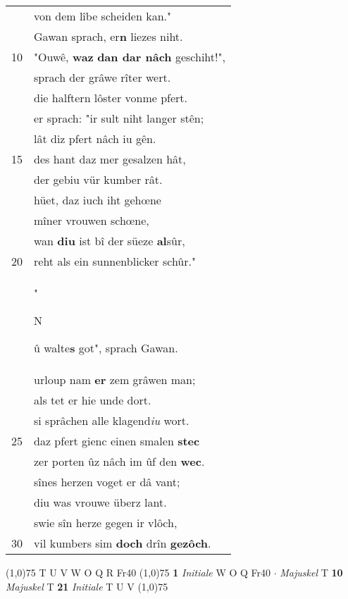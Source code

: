 \documentclass[8pt,a4paper,notitlepage]{article}
\begin{document}
\begin{table}[ht]
\begin{minipage}[t]{0.5\linewidth}
\begin{tabular}{rl}
 & von dem lîbe scheiden kan."\\ 
 & Gawan sprach, er\textbf{n} liezes niht.\\ 
10 & "Ouwê, \textbf{waz} \textbf{dan dar nâch} geschiht!",\\ 
 & sprach der grâwe rîter wert.\\ 
 & die halftern lôster vonme pfert.\\ 
 & er sprach: "ir sult niht langer stên;\\ 
 & lât diz pfert nâch iu gên.\\ 
15 & des hant daz mer gesalzen hât,\\ 
 & der gebiu vür kumber rât.\\ 
 & hüet, daz iuch iht gehœne\\ 
 & mîner vrouwen schœne,\\ 
 & wan \textbf{diu} ist bî der süeze \textbf{al}sûr,\\ 
20 & reht als ein sunnenblicker schûr."\\ 
 & "\begin{large}N\end{large}û walte\textbf{s} got", sprach Gawan.\\ 
 & urloup nam \textbf{er} zem grâwen man;\\ 
 & als tet er hie unde dort.\\ 
 & si sprâchen alle klagend\textit{iu} wort.\\ 
25 & daz pfert gienc einen smalen \textbf{stec}\\ 
 & zer porten ûz nâch im ûf den \textbf{wec}.\\ 
 & sînes herzen voget er dâ vant;\\ 
 & diu was vrouwe überz lant.\\ 
 & swie sîn herze gegen ir vlôch,\\ 
30 & vil kumbers sim \textbf{doch} drîn \textbf{gezôch}.\\ 
\end{tabular}
\scriptsize
\line(1,0){75} \newline
T U V W O Q R Fr40 \newline
\line(1,0){75} \newline
\textbf{1} \textit{Initiale} W O Q Fr40   $\cdot$ \textit{Majuskel} T  \textbf{10} \textit{Majuskel} T  \textbf{21} \textit{Initiale} T U V  \newline
\line(1,0){75} \newline

\end{minipage}
\end{table}
\end{document}

